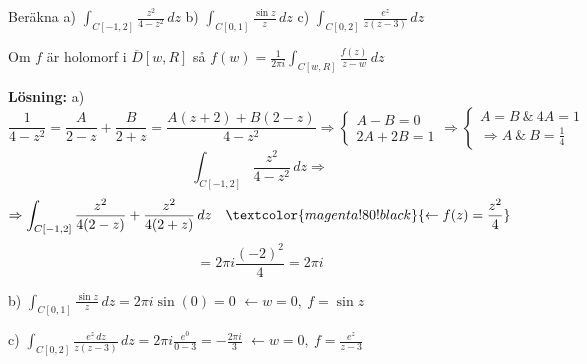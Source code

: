  \quad Beräkna \quad a) $\displaystyle\int_{C[-1, 2]} \frac{z^2}{4 - z^2}\,dz$ \quad b) $\displaystyle\int_{C[0, 1]} \frac{\sin z}{z}\,dz$ \quad c) $\displaystyle\int_{C[0, 2]} \frac{e^z}{z(z - 3)}\,dz$

\begin{theorem}
Om $f$ är holomorf i $\overline{D}[w, R]$ så $\displaystyle f(w) = \frac{1}{2\pi i} \int_{C[w, R]} \frac{f(z)}{z - w}\,dz$
\end{theorem}

\textbf{Lösning:} a)
\[ \frac{1}{4 - z^2} = \frac{A}{2 - z} + \frac{B}{2 + z} = \frac{A(z + 2) + B(2 - z)}{4 - z^2} \Rightarrow \begin{cases} A - B = 0 \\ 2A + 2B = 1 \end{cases} \Rightarrow \begin{cases} A = B \ \& \ 4A = 1 \\ \Rightarrow A \ \& \ B = \frac{1}{4} \end{cases} \]
\[ \int_{C[-1, 2]} \frac{z^2}{4 - z^2}\,dz \Rightarrow \]
\[ \Rightarrow \int_{C[-1, 2]} \frac{z^2}{4(2 - z)} + \frac{z^2}{4(2 + z)}\,dz \quad \textcolor{magenta!80!black}{\leftarrow f(z) = \frac{z^2}{4}} \]
\[ = 2\pi i \frac{(-2)^2}{4} = 2\pi i \]

b) \quad $\displaystyle\int_{C[0, 1]} \frac{\sin z}{z}\,dz = 2\pi i \sin(0) = 0$ \quad \textcolor{magenta!80!black}{$\leftarrow w = 0,\ f = \sin z$}

c) \quad $\displaystyle\int_{C[0, 2]} \frac{e^z\,dz}{z(z - 3)}\,dz = 2\pi i \frac{e^0}{0 - 3} = -\frac{2\pi i}{3}$ \quad \textcolor{magenta!80!black}{$\leftarrow w = 0,\ f = \frac{e^z}{z - 3}$}

